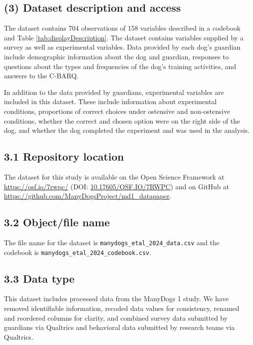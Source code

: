 \documentclass[
  man,floatsintext]{apa6}
\begin{document}
\hypertarget{dataset-description-and-access}{%
\subsection{(3) Dataset description and access}\label{dataset-description-and-access}}

The dataset contains 704 observations of 158 variables described in a codebook and Table \ref{tab:displayDescription}. The dataset contains variables supplied by a survey as well as experimental variables. Data provided by each dog's guardian include demographic information about the dog and guardian, responses to questions about the types and frequencies of the dog's training activities, and answers to the C-BARQ.

In addition to the data provided by guardians, experimental variables are included in this dataset. These include information about experimental conditions, proportions of correct choices under ostensive and non-ostensive conditions, whether the correct and chosen option were on the right side of the dog, and whether the dog completed the experiment and was used in the analysis.

\hypertarget{repository-location}{%
\subsection{3.1 Repository location}\label{repository-location}}

The dataset for this study is available on the Open Science Framework at \url{https://osf.io/7rwpc/} (DOI: \href{https://doi.org/10.17605/OSF.IO/7RWPC}{10.17605/OSF.IO/7RWPC}) and on GitHub at \url{https://github.com/ManyDogsProject/md1_datapaper}.

\hypertarget{objectfile-name}{%
\subsection{3.2 Object/file name}\label{objectfile-name}}

The file name for the dataset is \texttt{manydogs\_etal\_2024\_data.csv} and the codebook is \texttt{manydogs\_etal\_2024\_codebook.csv}.

\hypertarget{data-type}{%
\subsection{3.3 Data type}\label{data-type}}

This dataset includes processed data from the ManyDogs 1 study. We have removed identifiable information, recoded data values for consistency, renamed and reordered columns for clarity, and combined survey data submitted by guardians via Qualtrics and behavioral data submitted by research teams via Qualtrics.
\end{document}
